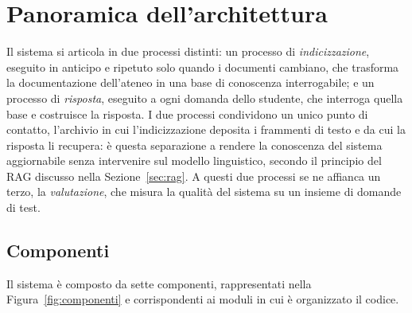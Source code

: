\section{Panoramica dell'architettura}\label{sec:panoramica}

Il sistema si articola in due processi distinti: un processo di \emph{indicizzazione}, eseguito in anticipo e
ripetuto solo quando i documenti cambiano, che trasforma la documentazione dell'ateneo in una base di conoscenza
interrogabile; e un processo di \emph{risposta}, eseguito a ogni domanda dello studente, che interroga quella base e
costruisce la risposta. I due processi condividono un unico punto di contatto, l'archivio in cui l'indicizzazione
deposita i frammenti di testo e da cui la risposta li recupera: è questa separazione a rendere la conoscenza del
sistema aggiornabile senza intervenire sul modello linguistico, secondo il principio del RAG discusso nella
Sezione~\ref{sec:rag}. A questi due processi se ne affianca un terzo, la \emph{valutazione}, che misura la qualità
del sistema su un insieme di domande di test.

\subsection*{Componenti}

Il sistema è composto da sette componenti, rappresentati nella Figura~\ref{fig:componenti} e corrispondenti ai
moduli in cui è organizzato il codice.

